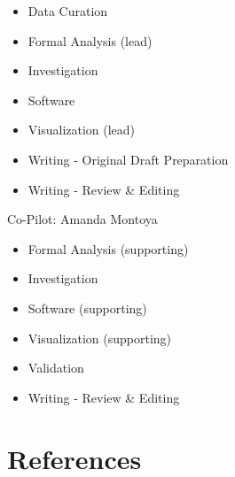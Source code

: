 \documentclass[10,a4paperpaper,]{article}
\begin{document}
\begin{itemize}
\tightlist
\item
  Data Curation\\
\item
  Formal Analysis (lead)\\
\item
  Investigation\\
\item
  Software\\
\item
  Visualization (lead)\\
\item
  Writing - Original Draft Preparation\\
\item
  Writing - Review \& Editing
\end{itemize}

Co-Pilot: Amanda Montoya

\begin{itemize}
\tightlist
\item
  Formal Analysis (supporting)\\
\item
  Investigation\\
\item
  Software (supporting)\\
\item
  Visualization (supporting)\\
\item
  Validation\\
\item
  Writing - Review \& Editing
\end{itemize}

\newpage

\section*{References}
\begingroup
\hphantom{x}
\setlength{\parindent}{-0.5in}
\setlength{\leftskip}{0.5in}
\end{document}
